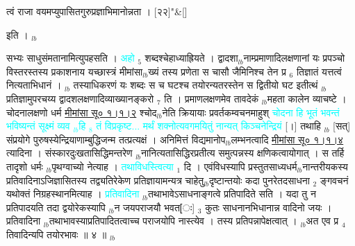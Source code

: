 \documentclass[article,12pt,a4paper]{memoir}%
\newcommand{\quotelemma}[1]{\textcolor{cyan}{#1}}
\newcounter{parCount}
\begin{document}
	    
	    \stanza[\smallbreak]
	  त्वं राजा वयमप्युपासितगुरुप्रज्ञाभिमानोन्नता । [२२]{\normalfontlatin\large\qquad{}"}\&[\smallbreak]
	  
	  
	  
	    \pstart  \leavevmode%
	    \hphantom{.}
	  इति ।
	{}
	\pend%
      {\tiny $_{lb}$}

	  
	  \pstart \leavevmode%
	\hphantom{.}सभ्यः साधुसंमतानामित्युपहसति । \quotelemma{अहो} {\tiny $_{5}$} शब्दश्चेहाध्याह्रियते । द्वादशा{\tiny $_{lb}$}नाम्प्रमाणादिलक्षणानां यः प्रपञ्चो विस्तरस्तस्य प्रकाशनाय यच्छास्त्रं मीमांसा{\tiny $_{lb}$}ख्यं तस्य प्रणेता स चासौ जैमिनिश्च तेन प्र {\tiny $_{6}$} तिज्ञातं यत्तत्वं नित्यताभिधानं । {\tiny $_{lb}$} \leavevmode{} तस्याधिकरणं यः शब्दः स च घटश्च तयोरन्यतरस्तेन स द्वितीयो घट इतीत्थं {\tiny $_{lb}$}प्रतिज्ञामुपरचय्य द्वादशलक्षणादिव्याख्यानङ्करो {\tiny $_{7}$} ति । प्रमाणलक्षणमेव तावदेकं {\tiny $_{lb}$}महता कालेन व्याचष्टे । चोदनालक्षणो धर्म \href{http://sarit.indology.info/?cref=M\%C4\%ABS\%C5\%AB.1.1.2}{मीमांसा सू० १।१।२} श्चोद{\tiny $_{lb}$}नेति क्रियायाः प्रवर्तकम्वचनमाहुश् \quotelemma{चोदना हि भूतं भवन्तं भविष्यन्तं सूक्ष्मं व्यव {\tiny $_{lb}$}हि {\tiny $_{8}$} \leavevmode\ledsidenote{\textenglish{48a/msK}} तं विप्रकृष्ट{...} मर्थं शक्नोत्यवगमयितुं नान्यत् किञ्चनेन्द्रियं} [।] तथाहि {\tiny $_{lb}$} [सत्] संप्रयोगे पुरुषस्येन्द्रियाणाम्बुद्धिजन्म तत्प्रत्यक्षं । अनिमित्तं विद्यमानोप{\tiny $_{lb}$}लम्भनत्वादि \href{http://sarit.indology.info/?cref=M\%C4\%ABS\%C5\%AB.1.1.4}{मीमांसा सू० १।१।४ } त्यादिना । संस्कारदुःखतासिद्धिमन्तरेण {\tiny $_{lb}$}नानित्यतासिद्धिरप्रतीत्य समुत्पन्नस्य क्षणिकत्वायोगात् । स तर्हि तादृशो धर्मः {\tiny $_{lb}$}पृथग्वाच्यो नेत्याह । \quotelemma{तथाविधस्त्वित्या} {\tiny $_{1}$} दि । एवंविधस्यापि प्रस्तुतसाध्यधर्म{\tiny $_{lb}$}नान्तरीयकस्य प्रतिवादिनाऽजिज्ञासितस्य तद्व्यतिरेकेण प्रतिज्ञायामन्यत्र चाहेतु{\tiny $_{lb}$}दृष्टान्तयोः कदा पुनरेतदसाधना {\tiny $_{2}$} ङ्गवचनं यथोक्तं निग्रहस्थानमित्याह । \quotelemma{प्रतिवादिना} {\tiny $_{lb}$}तथाभावेऽसाधनाङ्गत्वे प्रतिपादिते सति । यदा तु न प्रतिपादयति तदा द्वयोरेकस्यापि {\tiny $_{lb}$}न जयपराजयौ भवत[ः] {\tiny $_{3}$} कुतः साधनानभिधानान्न वादिनो जयः । प्रतिवादिना {\tiny $_{lb}$}तथाभावस्याप्रतिपादितत्वाच्च पराजयोपि नास्त्येव । तस्य प्रतिपन्नापेक्षत्वात् । {\tiny $_{lb}$}अत एव प्र {\tiny $_{4}$} तिवादिन्यपि तयोरभावः ॥ ४ ॥
	{}
	\pend%
      {\tiny $_{lb}$}
\end{document}
